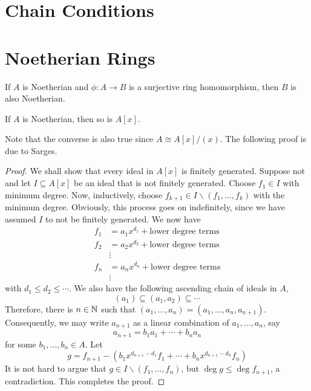 \section{Chain Conditions}

\section{Noetherian Rings}

\begin{lemma}
    If $A$ is Noetherian and $\phi: A\to B$ is a surjective ring homomorphism, then $B$ is also Noetherian.
\end{lemma}

\begin{theorem}
    If $A$ is Noetherian, then so is $A[x]$.
\end{theorem}
Note that the converse is also true since $A\cong A[x]/(x)$. The following proof is due to Sarges.
\begin{proof}
    We shall show that every ideal in $A[x]$ is finitely generated. Suppose not and let $I\subseteq A[x]$ be an ideal that is not finitely generated. Choose $f_1\in I$ with minimum degree. Now, inductively, choose $f_{k + 1}\in I\backslash(f_1,\ldots,f_k)$ with the minimum degree. Obviously, this process goes on indefinitely, since we have assumed $I$ to not be finitely generated. We now have 
    \begin{align*}
        f_1 &= a_1x^{d_1} + \text{lower degree terms}\\
        f_2 &= a_2x^{d_2} + \text{lower degree terms}\\
        &\vdots\\
        f_n &= a_nx^{d_n} + \text{lower degree terms}\\
        &\vdots
    \end{align*}
    with $d_1\le d_2\le\cdots$. We also have the following ascending chain of ideals in $A$, 
    \begin{equation*}
        (a_1)\subseteq(a_1,a_2)\subseteq\cdots
    \end{equation*}
    Therefore, there is $n\in\mathbb{N}$ such that $(a_1,\ldots,a_n) = (a_1,\ldots,a_n,a_{n + 1})$. Consequently, we may write $a_{n + 1}$ as a linear combination of $a_1,\ldots,a_n$, say 
    \begin{equation*}
        a_{n + 1} = b_1a_1 + \cdots + b_na_n
    \end{equation*}
    for some $b_1,\ldots,b_n\in A$. Let 
    \begin{equation*}
        g = f_{n + 1} - (b_1x^{d_{n + 1} - d_1}f_1 + \cdots + b_nx^{d_{n + 1} - d_n}f_n)
    \end{equation*}
    It is not hard to argue that $g\in I\backslash(f_1,\ldots,f_n)$, but $\deg g\le\deg f_{n + 1}$, a contradiction. This completes the proof.
\end{proof}


